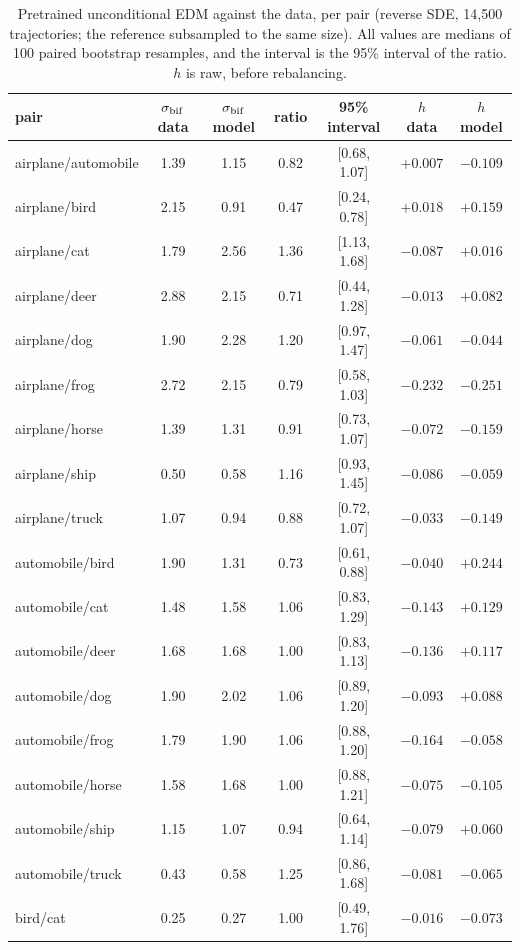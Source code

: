 \begin{table}[h]
\centering
\caption{Pretrained unconditional EDM against the data, per pair (reverse SDE, 14{,}500 trajectories; the reference subsampled to the same size). All values are medians of 100 paired bootstrap resamples, and the interval is the 95\% interval of the ratio. $h$ is raw, before rebalancing.}
\label{tab:pre_full}
\scriptsize
\begin{tabular}{lcccccc}
\toprule
pair & $\sigma_{\rm bif}$ data & $\sigma_{\rm bif}$ model & ratio & 95\% interval & $h$ data & $h$ model \\
\midrule
airplane/automobile & 1.39 & 1.15 & 0.82 & [0.68, 1.07] & $+0.007$ & $-0.109$ \\
airplane/bird & 2.15 & 0.91 & 0.47 & [0.24, 0.78] & $+0.018$ & $+0.159$ \\
airplane/cat & 1.79 & 2.56 & 1.36 & [1.13, 1.68] & $-0.087$ & $+0.016$ \\
airplane/deer & 2.88 & 2.15 & 0.71 & [0.44, 1.28] & $-0.013$ & $+0.082$ \\
airplane/dog & 1.90 & 2.28 & 1.20 & [0.97, 1.47] & $-0.061$ & $-0.044$ \\
airplane/frog & 2.72 & 2.15 & 0.79 & [0.58, 1.03] & $-0.232$ & $-0.251$ \\
airplane/horse & 1.39 & 1.31 & 0.91 & [0.73, 1.07] & $-0.072$ & $-0.159$ \\
airplane/ship & 0.50 & 0.58 & 1.16 & [0.93, 1.45] & $-0.086$ & $-0.059$ \\
airplane/truck & 1.07 & 0.94 & 0.88 & [0.72, 1.07] & $-0.033$ & $-0.149$ \\
automobile/bird & 1.90 & 1.31 & 0.73 & [0.61, 0.88] & $-0.040$ & $+0.244$ \\
automobile/cat & 1.48 & 1.58 & 1.06 & [0.83, 1.29] & $-0.143$ & $+0.129$ \\
automobile/deer & 1.68 & 1.68 & 1.00 & [0.83, 1.13] & $-0.136$ & $+0.117$ \\
automobile/dog & 1.90 & 2.02 & 1.06 & [0.89, 1.20] & $-0.093$ & $+0.088$ \\
automobile/frog & 1.79 & 1.90 & 1.06 & [0.88, 1.20] & $-0.164$ & $-0.058$ \\
automobile/horse & 1.58 & 1.68 & 1.00 & [0.88, 1.21] & $-0.075$ & $-0.105$ \\
automobile/ship & 1.15 & 1.07 & 0.94 & [0.64, 1.14] & $-0.079$ & $+0.060$ \\
automobile/truck & 0.43 & 0.58 & 1.25 & [0.86, 1.68] & $-0.081$ & $-0.065$ \\
bird/cat & 0.25 & 0.27 & 1.00 & [0.49, 1.76] & $-0.016$ & $-0.073$ \\

\end{tabular}
\end{table}
